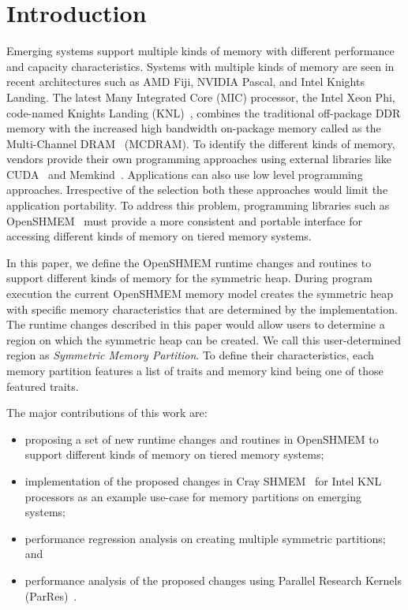 \section{Introduction}
\label{src:intro}

Emerging systems support multiple kinds of memory with different
performance and capacity characteristics. %
Systems with
multiple kinds of memory are seen in recent architectures such as
AMD Fiji, NVIDIA Pascal, and Intel Knights Landing. The latest
Many Integrated Core (MIC) processor, the Intel Xeon Phi,
code-named Knights Landing (KNL)~\cite{KNL}, combines the traditional
off-package DDR memory with the increased high bandwidth on-package
memory called as the Multi-Channel DRAM~\cite{MCDRAM} (MCDRAM). %
To identify the different kinds of memory,
vendors provide their own programming approaches
using external libraries like CUDA~\cite{cuda} and
Memkind~\cite{memkind}.
Applications can also use low level programming approaches.
Irrespective of the
selection both these approaches would limit the application
portability.%
To address this problem, programming libraries such as
OpenSHMEM~\cite{osm} must provide a more consistent and portable
interface
for accessing different kinds of memory on tiered memory systems.

In this paper, we define the OpenSHMEM runtime changes and routines
to support different kinds of memory for the symmetric heap. During
program execution the current
OpenSHMEM memory model creates the symmetric heap with specific
memory characteristics that are determined by the implementation.
The runtime changes described in this paper would allow users to
determine
a region on which the symmetric heap can be created. We call this
user-determined region as \emph{Symmetric Memory Partition}. To define
their characteristics, each memory partition features a list of traits
and memory kind being one of those featured traits.

The major contributions of this work are:
\begin{itemize}
    \item proposing a set of new runtime changes and routines in
    OpenSHMEM to support different kinds of memory on tiered memory
    systems;
    \item implementation of the proposed changes in
    Cray SHMEM~\cite{csma} for Intel KNL processors as an example
    use-case for memory partitions on emerging systems;
    \item performance regression analysis on creating multiple
    symmetric partitions; and
    \item performance analysis of the proposed changes using
    Parallel Research Kernels (ParRes)~\cite{parres}.
\end{itemize}

